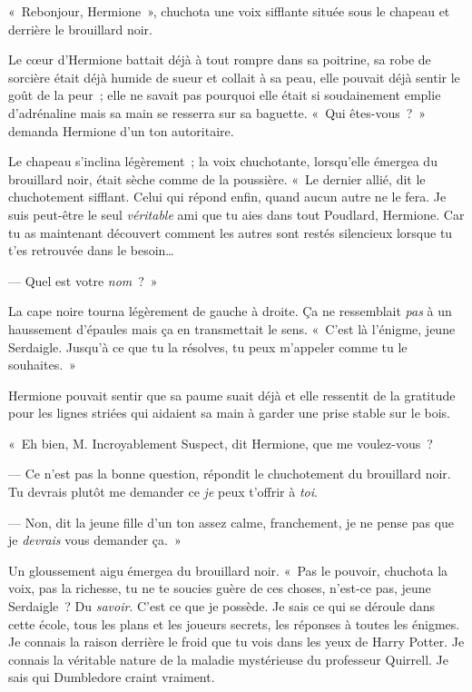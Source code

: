 «~Rebonjour, Hermione~», chuchota une voix sifflante située sous le chapeau et derrière le brouillard noir.

Le cœur d'Hermione battait déjà à tout rompre dans sa poitrine, sa robe de sorcière était déjà humide de sueur et collait à sa peau, elle pouvait déjà sentir le goût de la peur~; elle ne savait pas pourquoi elle était si soudainement emplie d'adrénaline mais sa main se resserra sur sa baguette. «~Qui êtes-vous~?~» demanda Hermione d'un ton autoritaire.

Le chapeau s'inclina légèrement~; la voix chuchotante, lorsqu'elle émergea du brouillard noir, était sèche comme de la poussière. «~Le dernier allié, dit le chuchotement sifflant. Celui qui répond enfin, quand aucun autre ne le fera. Je suis peut-être le seul \emph{véritable} ami que tu aies dans tout Poudlard, Hermione. Car tu as maintenant découvert comment les autres sont restés silencieux lorsque tu t'es retrouvée dans le besoin…

--- Quel est votre \emph{nom}~?~»

La cape noire tourna légèrement de gauche à droite. Ça ne ressemblait \emph{pas} à un haussement d'épaules mais ça en transmettait le sens. «~C'est là l'énigme, jeune Serdaigle. Jusqu'à ce que tu la résolves, tu peux m'appeler comme tu le souhaites.~»

Hermione pouvait sentir que sa paume suait déjà et elle ressentit de la gratitude pour les lignes striées qui aidaient sa main à garder une prise stable sur le bois.

«~Eh bien, M. Incroyablement Suspect, dit Hermione, que me voulez-vous~?

--- Ce n'est pas la bonne question, répondit le chuchotement du brouillard noir. Tu devrais plutôt me demander ce \emph{je} peux t'offrir à \emph{toi}.

--- Non, dit la jeune fille d'un ton assez calme, franchement, je ne pense pas que je \emph{devrais} vous demander ça.~»

Un gloussement aigu émergea du brouillard noir. «~Pas le pouvoir, chuchota la voix, pas la richesse, tu ne te soucies guère de ces choses, n'est-ce pas, jeune Serdaigle~? Du \emph{savoir}. C'est ce que je possède. Je sais ce qui se déroule dans cette école, tous les plans et les joueurs secrets, les réponses à toutes les énigmes. Je connais la raison derrière le froid que tu vois dans les yeux de Harry Potter. Je connais la véritable nature de la maladie mystérieuse du professeur Quirrell. Je sais qui Dumbledore craint vraiment.


